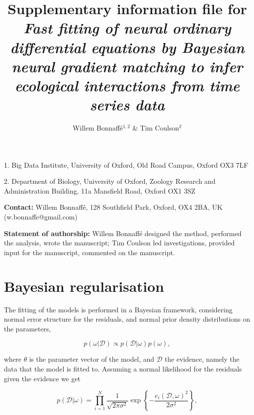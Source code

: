 \documentclass[11pt, oneside]{article}
\title{Supplementary information file for \textit{Fast fitting of neural ordinary differential equations by Bayesian neural gradient matching to infer ecological interactions from time series data}}
\author{Willem Bonnaff\'e$^{1,2}$ \& Tim Coulson$^2$}
\date{}
\newcommand{\beginsupplement}{%
        \setcounter{table}{0}
        \renewcommand{\thetable}{S\arabic{table}}%
        \setcounter{figure}{0}
        \renewcommand{\thefigure}{S\arabic{figure}}%
     }
\begin{document}
\maketitle
{}

1. Big Data Institute, University of Oxford, Old Road Campus, Oxford OX3 7LF 

2. Department of Biology, University of Oxford, Zoology Research and Administration Building, 11a Mansfield Road, Oxford OX1 3SZ 

\textbf{Contact:}
Willem Bonnaff\'e, 128 Southfield Park, Oxford, OX4 2BA, UK (w.bonnaffe@gmail.com)

\textbf{Statement of authorship:}
Willem Bonnaff\'e designed the method, performed the analysis, wrote the manuscript; 
Tim Coulson led investigations, provided input for the manuscript, commented on the manuscript.

\tableofcontents

\newpage
\appendix
\beginsupplement
{}

\section{Bayesian regularisation}

The fitting of the models is performed in a Bayesian framework, considering normal error structure for the residuals, and normal prior density distributions on the parameters,

\vspace{-0.5cm}
\begin{equation}
	p(\omega | \mathcal{D}) \propto  p(\mathcal{D} | \omega) p(\omega),
\end{equation}

where $\theta$ is the parameter vector of the model, and $\mathcal{D}$ the evidence, namely the data that the model is fitted to.
Assuming a normal likelihood for the residuals given the evidence we get

\vspace{-0.5cm}
\begin{equation}
	p( \mathcal{D} | \omega) = \prod_{i=1}^{N} \frac{1}{\sqrt{2\pi\sigma^2}}  \exp \left\{ -\frac{e_i(\mathcal{D},\omega)^2}{2\sigma^2}  \right\},
\end{equation}
\end{document}
